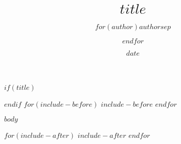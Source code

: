 \documentclass[11pt]{article}
\title{$title$}
\author{$for(author)$$author$$sep$ \and $endfor$}
\date{$date$}
\begin{document}
$if(title)$
\maketitle
$endif$
\thispagestyle{fancy} 
$for(include-before)$
$include-before$
$endfor$

\begin{flushleft}
$body$
\end{flushleft}

$for(include-after)$
$include-after$
$endfor$
\end{document}
